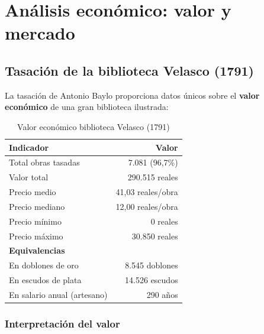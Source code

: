 \documentclass[12pt,a4paper]{article}
\begin{document}
\section{Análisis económico: valor y mercado}

\subsection{Tasación de la biblioteca Velasco (1791)}

La tasación de Antonio Baylo proporciona datos únicos sobre el \textbf{valor económico} de una gran biblioteca ilustrada:

\begin{table}[h]
\centering
\begin{tabular}{lr}
\toprule
\textbf{Indicador} & \textbf{Valor} \\
\midrule
Total obras tasadas & 7.081 (96,7\%) \\
Valor total & 290.515 reales \\
Precio medio & 41,03 reales/obra \\
Precio mediano & 12,00 reales/obra \\
Precio mínimo & 0 reales \\
Precio máximo & 30.850 reales \\
\midrule
\textbf{Equivalencias} & \\
En doblones de oro & 8.545 doblones \\
En escudos de plata & 14.526 escudos \\
En salario anual (artesano) & 290 años \\
\bottomrule
\end{tabular}
\caption{Valor económico biblioteca Velasco (1791)}
\end{table}

\subsubsection{Interpretación del valor}
\end{document}
